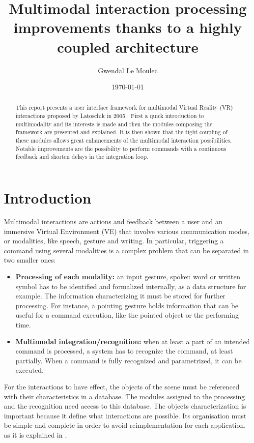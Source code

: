 \documentclass[a4paper]{article}
\title{Multimodal interaction processing improvements thanks to a highly coupled architecture}
\author{Gwendal Le Moulec}
\date{\today}
\begin{document}
\maketitle

\begin{abstract}
This report presents a user interface framework for multimodal Virtual Reality (VR) interactions proposed by Latoschik in 2005 \cite{latoschik}. First a quick introduction to multimodality and its interests is made and then the modules composing the framework are presented and explained. It is then shown that the tight coupling of these modules allows great enhancements of the multimodal interaction possibilities. Notable improvements are the possibility to perform commands with a continuous feedback and shorten delays in the integration loop.
\end{abstract}

\tableofcontents

\section{Introduction}

Multimodal interactions are actions and feedback between a user and an immersive Virtual Environment (VE) that involve various communication modes, or modalities, like speech, gesture and writing. In particular, triggering a command using several modalities is a complex problem that can be separated in two smaller ones:
\begin{itemize}
	\item \textbf{Processing of each modality:} an input gesture, spoken word or written symbol has to be identified and formalized internally, as a data structure for example. The information characterizing it must be stored for further processing. For instance, a pointing gesture holds information that can be useful for a command execution, like the pointed object or the performing time.
	\item \textbf{Multimodal integration/recognition:} when at least a part of an intended command is processed, a system has to recognize the command, at least partially. When a command is fully recognized and parametrized, it can be executed.
\end{itemize}

For the interactions to have effect, the objects of the scene must be referenced with their characteristics in a database. The modules assigned to the processing and  the recognition need access to this database. The objects characterization is important because it define what interactions are possible. Its organisation must be simple and complete in order to avoid reimplementation for each application, as it is explained in \cite{krl}.
\end{document}
